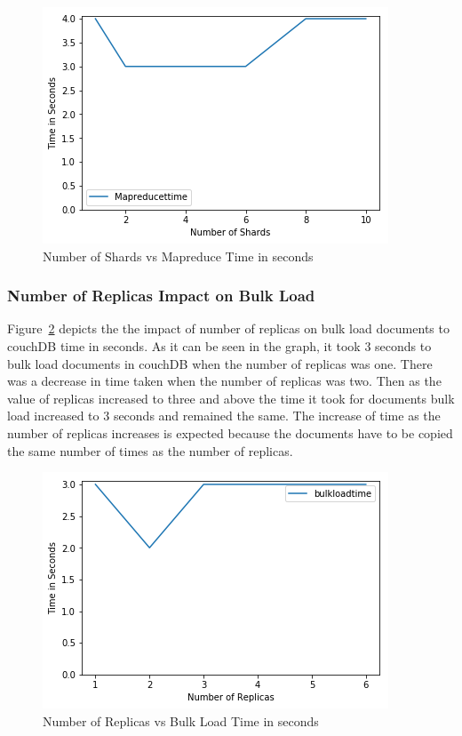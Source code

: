 \begin{figure}[!ht]
  \centering\includegraphics[width=\columnwidth]{../images/ShardsMapReduce.png}
  \caption{Number of Shards vs Mapreduce Time in seconds }\label{f:shard-mapreduce}
\end{figure}

\subsubsection{Number of Replicas Impact on Bulk Load}


Figure~\ref{f:replica-bulk} depicts the the impact of number of replicas
on bulk load documents to couchDB time in seconds. As it can be seen
in the graph, it took 3 seconds to bulk load documents in couchDB when
the number of replicas was one. There was a decrease in time
taken when the number of replicas was two. Then as the value of
replicas increased to three and above the time it took for documents
bulk load increased to 3 seconds and remained the same. The increase
of time as the number of replicas increases is expected because the
documents have to be copied the same number of times as the number of
replicas. 


\begin{figure}[!ht]
  \centering\includegraphics[width=\columnwidth]{../images/ReplicasBulkLoad.png}
  \caption{Number of Replicas vs Bulk Load Time in seconds }\label{f:replica-bulk}
\end{figure}

